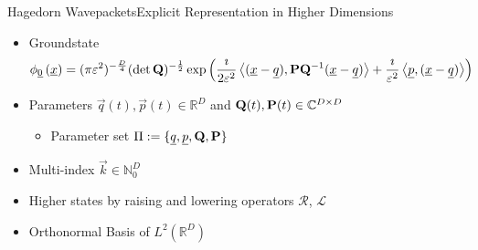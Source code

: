 \documentclass{beamer}
\begin{document}
\begin{frame}{Hagedorn Wavepackets}{Explicit Representation in Higher Dimensions}
  \begin{itemize}
    \item Groundstate
    {\scriptsize
    \begin{align*}
      \phi_{\underline{0}}\left(\underline{x}\right)
      =
      (\pi\varepsilon^2)^{-\frac{D}{4}} (\det\mathbf{Q})^{-\frac{1}{2}}
      \exp \left( \frac{\imath}{2\varepsilon^2}
      \left\langle (\underline{x}-\underline{q}) , \mathbf{P}\mathbf{Q}{}^{-1}(\underline{x}-\underline{q}) \right\rangle
      + \frac{\imath}{\varepsilon^2} \left\langle \underline{p} , (\underline{x}-\underline{q}) \right\rangle
      \right)
    \end{align*}}
    \item Parameters $\vec{q}(t), \vec{p}(t) \in \mathbb{R}^D$ and $\mathbf{Q}(t), \mathbf{P}(t) \in \mathbb{C}^{D \times D}$
    \begin{itemize}
      \item Parameter set $\Pi := \{\underline{q}, \underline{p}, \mathbf{Q}, \mathbf{P}\}$
    \end{itemize}
    \vspace{0.2cm}
    \item Multi-index $\vec{k} \in \mathbb{N}_0^D$
    \item Higher states by raising and lowering operators $\mathcal{R}$, $\mathcal{L}$
    \item Orthonormal Basis of $L^2(\mathbb{R}^D)$
  \end{itemize}
\end{frame}
\end{document}
